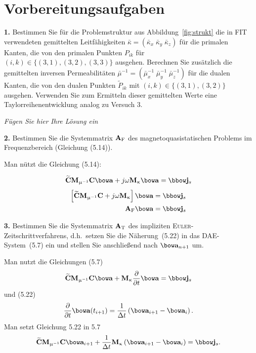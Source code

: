 \documentclass[Protokollheft.tex]{subfiles}
\begin{document}
\section{Vorbereitungsaufgaben}

\begin{framed}
	\noindent \textbf{1.} Bestimmen Sie für die Problemstruktur aus Abbildung~\ref{fig:strukt} die in FIT verwendeten
    gemittelten Leitfähigkeiten $\bar{\kappa}=(\bar{\kappa}_x\;\bar{\kappa}_y\;\bar{\kappa}_z)$ für die primalen Kanten, die von den primalen Punkten $P_{ik}$ für $(i,k)\in\{(3,1),(3,2),(3,3)\}$ ausgehen. Berechnen Sie zusätzlich die gemittelten inversen Permeabilitäten $\bar{\mu}^{-1}=(\bar{\mu}_x^{-1}\;\bar{\mu}_y^{-1}\;\bar{\mu}_z^{-1})$ für die dualen Kanten, die von den dualen Punkten $\widetilde{P}_{ik}$ mit $(i,k)\in\{(3,1),(3,2)\}$ ausgehen. Verwenden Sie zum Ermitteln dieser gemittelten Werte eine Taylorreihenentwicklung analog zu Versuch 3.\label{exer:averagedMaterials}
\end{framed}

\emph{Fügen Sie hier Ihre Lösung ein}

\begin{framed}
	\noindent \textbf{2.} Bestimmen Sie die Systemmatrix $ \mathbf{A} _\text{F}$ des magnetoquasistatischen Problems im Frequenzbereich (Gleichung (5.14)).\label{exer:systemMatMQSF}
\end{framed}

Man nützt die Gleichung (5.14):

$$ \curldfit\Mmui\curlfit\afit + j \omega\Mkap\afit = \jfit_{\boldmath{s}} $$
\begin{eqnarray}
\left[ \curldfit\Mmui\curlfit + j \omega\Mkap \right]\afit = \jfit_{\boldmath{s}} \\
\Amat_\text{F}\afit=\jfit_{\boldmath{s}}
 \end{eqnarray}
\begin{framed}
	\noindent \textbf{3.} Bestimmen Sie die Systemmatrix $ \mathbf{A} _\text{T}$ des impliziten
      \textsc{Euler}-Zeitschrittverfahrens, d.h.\ setzen Sie die Näherung~(5.22) in das DAE-System~(5.7) ein und stellen Sie anschließend nach $\afit_{n+1}$ um.\label{exer:systemMatMQST}
\end{framed}
Man nutzt die Gleichungen (5.7)
$$ \curldfit\Mmui\curlfit\afit +           \Mkap      \frac{\partial }{\partial t}\afit = \jfit_{\boldmath{s}} $$
und (5.22)
$$ \frac{\partial }{\partial t}\afit(t_{i+1})=\frac{1}{\Delta t}\left(\afit_{i+1} - \afit_i\right).$$
Man setzt  Gleichung 5.22 in 5.7
$$ \curldfit\Mmui\curlfit\afit_{i+1}+\frac{1}{\Delta t}\Mkap\left(\afit_{i+1} - \afit_i\right)= \jfit_{\boldmath{s}}. $$
\end{document}

